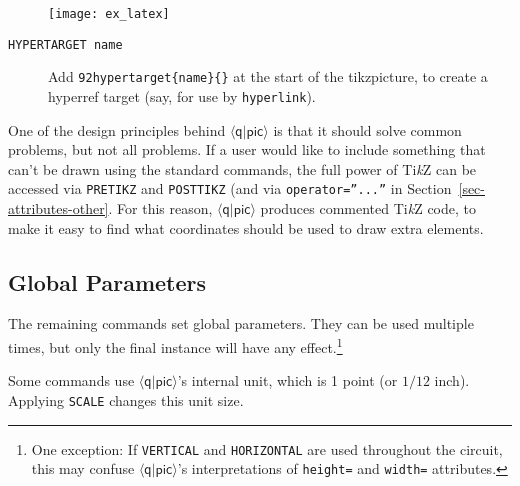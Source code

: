 \documentclass[twoside,12pt]{article}
\newcommand{\qpic}{$\langle\mathsf{q}|\mathsf{pic}\rangle$\xspace}
\newcommand{\TikZ}{Ti\emph{k}Z\xspace}
\begin{document}
\begin{description}
\begin{minipage}[b]{4in}

\end{minipage} \hfill \texttt{[image: ex\_latex]}

\item[{\tt HYPERTARGET name}] Add {\tt \char92hypertarget\{name\}\{\}} at the start of
  the tikzpicture, to create a hyperref target (say, for use by {\tt hyperlink}).

\begin{minipage}[b]{3.5in}

\end{minipage} \hfill 

\end{description}

One of the design principles behind \qpic is that it should solve common problems, but not all
problems.  If a user would like to include something that can't be drawn using the standard
commands, the full power of \TikZ can be accessed via {\tt PRETIKZ} and {\tt POSTTIKZ} (and via {\tt operator=''...''} in Section~\ref{sec-attributes-other}.
For this
reason, \qpic produces commented \TikZ code, to make it easy to find what coordinates should be
used to draw extra elements.


\subsection{Global Parameters}
\label{sec-parameters}

The remaining commands set global parameters.  They can be used multiple times, but only
the final instance will have any effect.\footnote{One exception:  If {\tt VERTICAL} and {\tt HORIZONTAL}
are used throughout the circuit, this may confuse \qpic's interpretations of {\tt height=}
and {\tt width=} attributes.}

Some commands use \qpic's internal unit, which is 1 point (or $1/12$ inch).  Applying
{\tt SCALE} changes this unit size.
\end{document}
